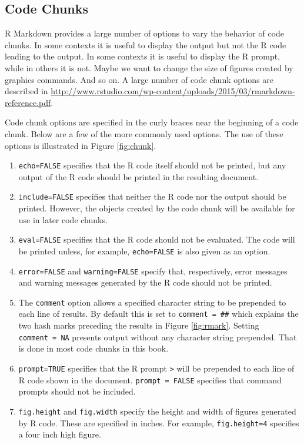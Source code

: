 \documentclass[
]{krantz}
\begin{document}
\hypertarget{chunks}{%
\subsection{Code Chunks}\label{chunks}}

R Markdown provides a large number of options to vary the behavior of code chunks. In some contexts it is useful to display the output but not the R code leading to the output. In some contexts it is useful to display the R prompt, while in others it is not. Maybe we want to change the size of figures created by graphics commands. And so on. A large number of code chunk options are described in \url{http://www.rstudio.com/wp-content/uploads/2015/03/rmarkdown-reference.pdf}.

Code chunk options are specified in the curly braces near the beginning of a code chunk. Below are a few of the more commonly used options. The use of these options is illustrated in Figure \ref{fig:chunk}.

\begin{enumerate}
\def\labelenumi{\arabic{enumi}.}
\item
  \texttt{echo=FALSE} specifies that the R code itself should not be printed, but any output of the R code should be printed in the resulting document.
\item
  \texttt{include=FALSE} specifies that neither the R code nor the output should be printed. However, the objects created by the code chunk will be available for use in later code chunks.
\item
  \texttt{eval=FALSE} specifies that the R code should not be evaluated. The code will be printed unless, for example, \texttt{echo=FALSE} is also given as an option.
\item
  \texttt{error=FALSE} and \texttt{warning=FALSE} specify that, respectively, error messages and warning messages generated by the R code should not be printed.
\item
  The \texttt{comment} option allows a specified character string to be prepended to each line of results. By default this is set to \texttt{comment\ =\ \textquotesingle{}\#\#\textquotesingle{}} which explains the two hash marks preceding the results in Figure \ref{fig:rmark}. Setting \texttt{comment\ =\ NA} presents output without any character string prepended. That is done in most code chunks in this book.
\item
  \texttt{prompt=TRUE} specifies that the R prompt \texttt{\textgreater{}} will be prepended to each line of R code shown in the document. \texttt{prompt\ =\ FALSE} specifies that command prompts should not be included.
\item
  \texttt{fig.height} and \texttt{fig.width} specify the height and width of figures generated by R code. These are specified in inches. For example, \texttt{fig.height=4} specifies a four inch high figure.
\end{enumerate}
\end{document}
